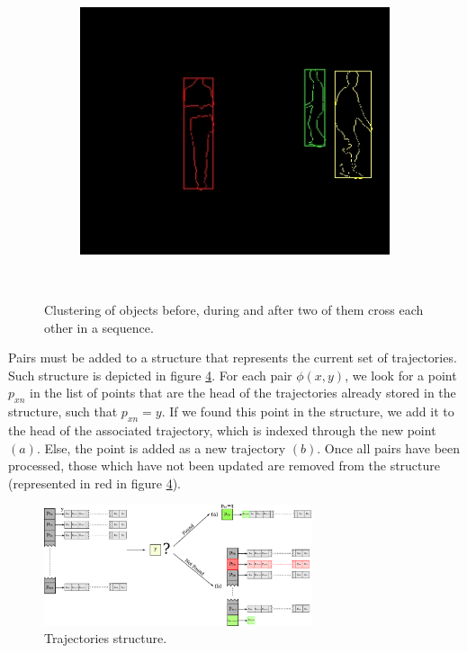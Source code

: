 \begin{figure}[t]
\begin{subfigure}[b]{0.32\textwidth}
                \label{fig:cp02_cluster2}
        \end{subfigure}%
        ~ %
        \begin{subfigure}[b]{0.32\textwidth}
                \centering
                \caption{~}
                \includegraphics[width=\textwidth]{fig3.jpg}
                \label{fig:cp02_cluster3}
        \end{subfigure}%
        \caption{Clustering of objects before, during and after two of them cross each other in a sequence.}\label{fig:cp02_clusterization_output}
\end{figure}

Pairs must be added to a structure that represents the current set of trajectories. Such structure is depicted in figure \ref{fig:cp02_trajectories_structure}. For each pair $\phi(x,y)$, we look for a point $p_{xn}$ in the list of points that are the head of the trajectories already stored in the structure, such that $p_{xn} = y$. If we found this point in the structure, we add it to the head of the associated trajectory, which is indexed through the new point $(a)$. Else, the point is added as a new trajectory $(b)$. Once all pairs have been processed, those which have not been updated are removed from the structure (represented in red in figure \ref{fig:cp02_trajectories_structure}).

\begin{figure}[h]
  \centering
  \includegraphics[width=0.7\textwidth, trim=0 0 0 0,clip]{fig4.pdf}
  \caption{Trajectories structure.}
  \label{fig:cp02_trajectories_structure}
\end{figure}

